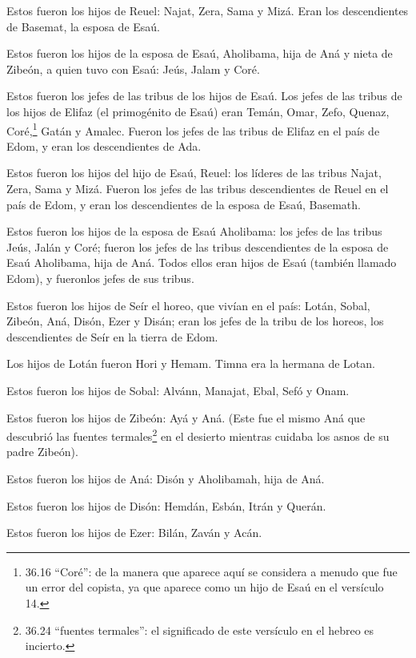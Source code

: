  Estos fueron los hijos de Reuel: Najat, Zera, Sama y Mizá.
Eran los descendientes de Basemat, la esposa de Esaú.

 Estos fueron los hijos de la esposa de Esaú, Aholibama,
hija de Aná y nieta de Zibeón, a quien tuvo con Esaú: Jeús, Jalam y
Coré.

 Estos fueron los jefes de las tribus de los hijos de Esaú.
Los jefes de las tribus de los hijos de Elifaz (el primogénito de Esaú)
eran Temán, Omar, Zefo, Quenaz,  Coré,\footnote{36.16
  ``Coré'': de la manera que aparece aquí se considera a menudo que fue
  un error del copista, ya que aparece como un hijo de Esaú en el
  versículo 14.} Gatán y Amalec. Fueron los jefes de las tribus de
Elifaz en el país de Edom, y eran los descendientes de Ada.

 Estos fueron los hijos del hijo de Esaú, Reuel: los
líderes de las tribus Najat, Zera, Sama y Mizá. Fueron los jefes de las
tribus descendientes de Reuel en el país de Edom, y eran los
descendientes de la esposa de Esaú, Basemath.

 Estos fueron los hijos de la esposa de Esaú Aholibama: los
jefes de las tribus Jeús, Jalán y Coré; fueron los jefes de las tribus
descendientes de la esposa de Esaú Aholibama, hija de Aná. 
Todos ellos eran hijos de Esaú (también llamado Edom), y fueronlos jefes
de sus tribus.

 Estos fueron los hijos de Seír el horeo, que vivían en el
país: Lotán, Sobal, Zibeón, Aná,  Disón, Ezer y Disán; eran
los jefes de la tribu de los horeos, los descendientes de Seír en la
tierra de Edom.

 Los hijos de Lotán fueron Hori y Hemam. Timna era la
hermana de Lotan.

 Estos fueron los hijos de Sobal: Alvánn, Manajat, Ebal,
Sefó y Onam.

 Estos fueron los hijos de Zibeón: Ayá y Aná. (Este fue el
mismo Aná que descubrió las fuentes termales\footnote{36.24 ``fuentes
  termales'': el significado de este versículo en el hebreo es incierto.}
en el desierto mientras cuidaba los asnos de su padre Zibeón).

 Estos fueron los hijos de Aná: Disón y Aholibamah, hija de
Aná.

 Estos fueron los hijos de Disón: Hemdán, Esbán, Itrán y
Querán.

 Estos fueron los hijos de Ezer: Bilán, Zaván y Acán.

